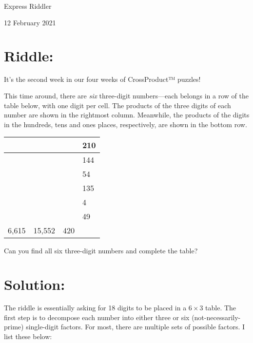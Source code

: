\documentclass{article}
\begin{document}
\pagestyle{empty} %

\begin{center}
{\LARGE Express Riddler}

\vspace{0.15in}

{\Large 12 February 2021}
\end{center}


\section*{Riddle:}

It’s the second week in our four weeks of CrossProduct™ puzzles!

This time around, there are \textit{six} three-digit numbers---each belongs in a row of the table below, with one digit per cell.
The products of the three digits of each number are shown in the rightmost column.
Meanwhile, the products of the digits in the hundreds, tens and ones places, respectively, are shown in the bottom row.

\begin{center}
\begin{tabular}{|C{0.75in}|C{0.75in}|C{0.75in}!{\vrule width 1.5pt}R{0.75in}|}
\hline
 & & & 210 \\
\hline
 & & & 144 \\
\hline
 & & & 54 \\
\hline
 & & & 135 \\
\hline
 & & & 4 \\
\hline
 & & & 49 \\
6,615 & 15,552 & 420 & \\
\hline
\end{tabular}
\end{center}

Can you find all six three-digit numbers and complete the table?

\section*{Solution:}

The riddle is essentially asking for 18 digits to be placed in a $6\times3$ table.
The first step is to decompose each number into either three or six (not-necessarily-prime) single-digit factors.
For most, there are multiple sets of possible factors.
I list these below:
\end{document}
